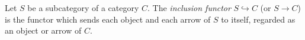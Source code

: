 Let $S$ be a subcategory of a category $C$. The \emph{inclusion functor} $S \hookrightarrow C$ (or $S \rightarrow C$) is the functor which sends each object and each arrow of $S$ to itself, regarded as an object or arrow of $C$.

